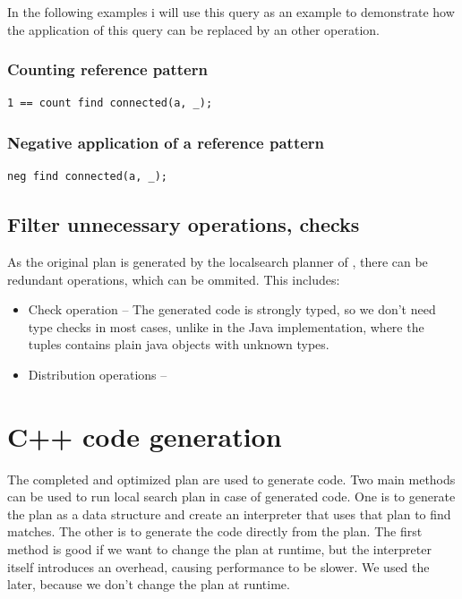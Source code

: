 In the following examples i will use this query as an example to demonstrate how the application of this query can be replaced by an other operation.

\subsubsection{Counting reference pattern}
\begin{lstlisting}[language = vql]
1 == count find connected(a, _);
\end{lstlisting}


\subsubsection{Negative application of a reference pattern}

\begin{lstlisting}[language = vql]
neg find connected(a, _);
\end{lstlisting}

\subsection{Filter unnecessary operations, checks}
As the original plan is generated by the localsearch planner of \viatra{}, there can be redundant operations, which can be ommited. This includes:

\begin{itemize}
	\item Check operation -- The generated code is strongly typed, so we don't need type checks in most cases, unlike in the Java implementation, where the tuples contains plain java objects with unknown types.
	
	\item Distribution operations -- 
\end{itemize}



\section{C++ code generation}

The completed and optimized plan are used to generate \cpp{} code. 
Two main methods can be used to run local search plan in case of generated code. 
One is to generate the plan as a data structure and create an interpreter that uses that plan to find matches. 
The other is to generate the code directly from the plan. 
The first method is good if we want to change the plan at runtime, but the interpreter itself introduces an overhead, causing performance to be slower.
We used the later, because we don't change the plan at runtime.












